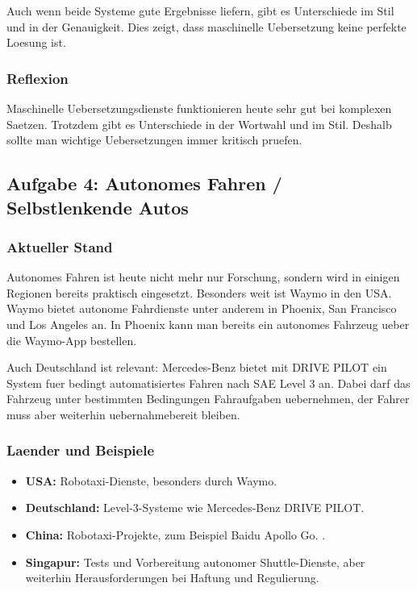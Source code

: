 \documentclass[12pt,a4paper]{article}
\begin{document}
Auch wenn beide Systeme gute Ergebnisse liefern, gibt es Unterschiede im Stil und in der Genauigkeit.
Dies zeigt, dass maschinelle Uebersetzung keine perfekte Loesung ist.

\subsubsection*{Reflexion}

Maschinelle Uebersetzungsdienste funktionieren heute sehr gut bei komplexen Saetzen.
Trotzdem gibt es Unterschiede in der Wortwahl und im Stil.
Deshalb sollte man wichtige Uebersetzungen immer kritisch pruefen.
\subsection{Aufgabe 4: Autonomes Fahren / Selbstlenkende Autos}



\subsubsection*{Aktueller Stand}

Autonomes Fahren ist heute nicht mehr nur Forschung, sondern wird in einigen Regionen
bereits praktisch eingesetzt. Besonders weit ist Waymo in den USA. Waymo bietet
autonome Fahrdienste unter anderem in Phoenix, San Francisco und Los Angeles an.
In Phoenix kann man bereits ein autonomes Fahrzeug ueber die Waymo-App bestellen.
\cite{waymo_phoenix}

Auch Deutschland ist relevant: Mercedes-Benz bietet mit DRIVE PILOT ein System fuer
bedingt automatisiertes Fahren nach SAE Level 3 an. Dabei darf das Fahrzeug unter
bestimmten Bedingungen Fahraufgaben uebernehmen, der Fahrer muss aber weiterhin
uebernahmebereit bleiben. \cite{mercedes_drive_pilot}

\subsubsection*{Laender und Beispiele}

\begin{itemize}
    \item \textbf{USA:} Robotaxi-Dienste, besonders durch Waymo.
    \item \textbf{Deutschland:} Level-3-Systeme wie Mercedes-Benz DRIVE PILOT.
    \item \textbf{China:} Robotaxi-Projekte, zum Beispiel Baidu Apollo Go. \cite{china_av}.  
   \item \textbf{Singapur:} Tests und Vorbereitung autonomer Shuttle-Dienste, aber weiterhin Herausforderungen bei Haftung und Regulierung. \cite{singapore_av}
\end{itemize}
\end{document}
